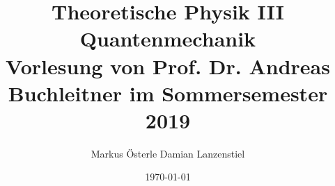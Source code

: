 \documentclass[titlepage,11pt,a4paper,ngerman]{report}
\begin{document}
\title{
	{\Huge Theoretische Physik III}\\[1em]
	{\huge Quantenmechanik}\\[1em]
	{\Large Vorlesung von Prof. Dr. Andreas Buchleitner im Sommersemester 2019}}
\author{Markus Österle \hspace{5pt} Damian Lanzenstiel}
\date{ \today}
\maketitle
\tableofcontents














%
%
\end{document}
